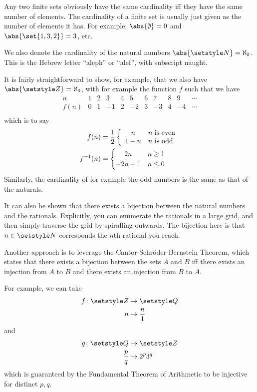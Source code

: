Any two finite sets obviously have the same cardinality iff they have the same
number of elements. The cardinality of a finite set is usually just given as the
number of elements it has. For example, \(\abs{\emptyset} = 0\) and
\(\abs{\set{1, 3, 2}} = 3\), etc.

We also denote the cardinality of the natural numbers
\(\abs{\Naturals} = \aleph_0\). This is the Hebrew letter ``aleph'' or ``alef'',
with subscript naught.

It is fairly straightforward to show, for example, that we also have
\(\abs{\Integers} = \aleph_0\), with for example the function \(f\) such that we
have
\begin{equation*}
 \begin{array}{c|r|r|r|r|r|r|r|r|r|r}
  n & 1 & 2 & 3 & 4 & 5 & 6 & 7 & 8 & 9 & \cdots \\
  \hline
  f(n) & 0 & 1 & -1 & 2 & -2 & 3 & -3 & 4 & -4 & \cdots \\
 \end{array}
\end{equation*}
which is to say
\begin{align*}
 f(n) &=
  \frac 12 \left\{
  \begin{array}{cl}
   n & \text{\(n\) is even} \\
   1 - n & \text{\(n\) is odd}
  \end{array}
  \right. \\
 f^{-1}(n) &=
  \begin{cases}
   \hfil 2n & n \ge 1 \\
   \hfil -2n + 1 & n \le 0
  \end{cases}
\end{align*}
Similarly, the cardinality of for example the odd numbers is the same as that of
the naturals.

It can also be shown that there exists a bijection between the natural numbers
and the rationals. Explicitly, you can enumerate the rationals in a large grid,
and then simply traverse the grid by spiralling outwards. The bijection here is
that \(n \in \Naturals\) corresponds the \(n\)th rational you reach.

Another approach is to leverage the Cantor-Schr\"oder-Bernstein Theorem, which
states that there exists a bijection between the sets \(A\) and \(B\) iff there
exists an injection from \(A\) to \(B\) and there exists an injection from \(B\)
to \(A\).

For example, we can take
\begin{align*}
 f \colon \Integers &\to \Rationals \\
          n &\mapsto \frac n1
\end{align*}
and
\begin{align*}
 g \colon \Rationals &\to \Integers \\
          \frac pq &\mapsto 2^p 3^q
\end{align*}
which is guaranteed by the Fundamental Theorem of Arithmetic to be injective for
distinct \(p, q\).

